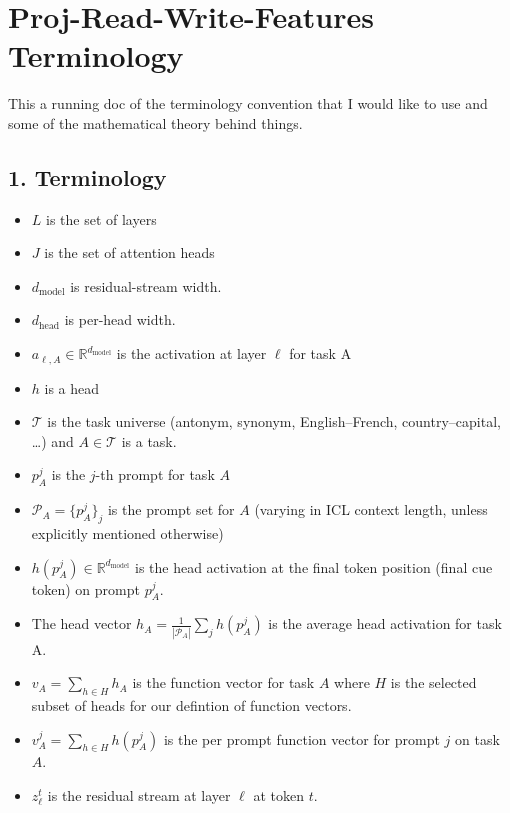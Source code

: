 \documentclass[
]{article}
\author{}
\date{}
\providecommand{\tightlist}{%
  \setlength{\itemsep}{0pt}\setlength{\parskip}{0pt}}
\begin{document}
\section{Proj-Read-Write-Features
Terminology}\label{proj-read-write-features-terminology}

This a running doc of the terminology convention that I would like to
use and some of the mathematical theory behind things.

\subsection{1. Terminology}\label{terminology}

\begin{itemize}
\tightlist
\item
  \(L\) is the set of layers
\item
  \(J\) is the set of attention heads
\item
  \(d_{\mathrm{model}}\) is residual-stream width.
\item
  \(d_{\mathrm{head}}\) is per-head width.
\item
  \(a_{\ell, A} \in \mathbb{R}^{d_{\mathrm{model}}}\) is the activation
  at layer \(\ell\) for task A
\item
  \(h\) is a head
\item
  \(\mathcal{T}\) is the task universe (antonym, synonym,
  English--French, country--capital, \ldots) and \(A \in \mathcal{T}\)
  is a task.
\item
  \(p_A^j\) is the \(j\)-th prompt for task \(A\)
\item
  \(\mathcal{P}_A = \{p_A^j\}_j\) is the prompt set for \(A\) (varying
  in ICL context length, unless explicitly mentioned otherwise)
\item
  \(h(p_A^j) \in \mathbb{R}^{d_{\mathrm{model}}}\) is the head
  activation at the final token position (final cue token) on prompt
  \(p_A^j\).
\item
  The head vector \(h_A = \frac{1}{|\mathcal{P}_A|} \sum_j h(p_A^j)\) is
  the average head activation for task A.
\item
  \(v_A = \sum_{h \in H} h_A\) is the function vector for task \(A\)
  where \(H\) is the selected subset of heads for our defintion of
  function vectors.
\item
  \(v^j_A = \sum_{h \in H} h(p_A^j)\) is the per prompt function vector
  for prompt \(j\) on task \(A\).
\item
  \(z^t_\ell\) is the residual stream at layer \(\ell\) at token \(t\).
\end{itemize}
\end{document}

